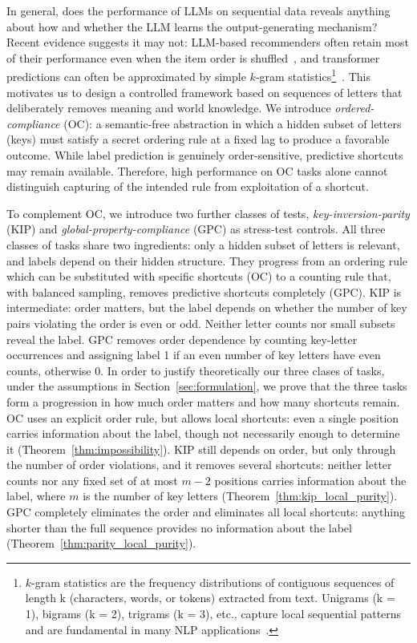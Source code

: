 \documentclass{article} %
\theoremstyle{plain}
\theoremstyle{definition}
\theoremstyle{remark}
\begin{document}
In general, does the performance of LLMs on sequential data reveals anything about how and whether the LLM learns the output-generating mechanism? Recent evidence suggests it may not: LLM-based recommenders often retain most of their performance even when the item order is shuffled~\citep{kimLostSequenceLarge2025b}, and transformer predictions can often be approximated by simple $k$-gram statistics\footnote{$k$-gram statistics are the frequency distributions of contiguous sequences of length k (characters, words, or tokens) extracted from text. Unigrams (k = 1), bigrams (k = 2), trigrams (k = 3), etc., capture local sequential patterns and are fundamental in many NLP applications~\citep{kgram}.}~\citep{nguyen2024understanding}. This motivates us to design a controlled framework based on sequences of letters that deliberately removes meaning and world knowledge. We introduce \emph{ordered-compliance} (OC): a semantic-free abstraction in which a hidden subset of letters (keys) must satisfy a secret ordering rule at a fixed lag to produce a favorable outcome. While label prediction is genuinely order-sensitive, predictive shortcuts may remain available. Therefore, high performance on OC tasks alone cannot distinguish capturing of the intended rule from exploitation of a shortcut.

To complement OC, we introduce two further classes of tests, \emph{key-inversion-parity} (KIP) and \emph{global-property-compliance} (GPC) as stress-test controls. All three classes of tasks share two ingredients: only a hidden subset of letters is relevant, and labels depend on their hidden structure. They progress from an ordering rule which can be substituted with specific shortcuts (OC) to a counting rule that, with balanced sampling, removes predictive shortcuts completely (GPC). KIP is intermediate: order matters, but the label depends on whether the number of key pairs violating the order is even or odd. Neither letter counts nor small subsets reveal the label. GPC removes order dependence by counting key-letter occurrences and assigning label 1 if an even number of key letters have even counts, otherwise 0. In order to justify theoretically our three clases of tasks, under the assumptions in Section~\ref{sec:formulation}, we prove that the three tasks form a progression in how much order matters and how many shortcuts remain. OC uses an explicit order rule, but allows local shortcuts: even a single position carries information about the label, though not necessarily enough to determine it (Theorem~\ref{thm:impossibility}). KIP still depends on order, but only through the number of order violations, and it removes several shortcuts: neither letter counts nor any fixed set of at most $m-2$ positions carries information about the label, where $m$ is the number of key letters (Theorem~\ref{thm:kip_local_purity}). GPC completely eliminates the order and eliminates all local shortcuts: anything shorter than the full sequence provides no information about the label (Theorem~\ref{thm:parity_local_purity}).
\end{document}
